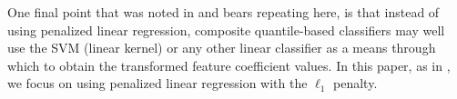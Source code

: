 One final point that was noted in \cite{fan2016} and bears repeating here, is
that instead of using penalized linear regression, composite quantile-based
classifiers may well use the SVM (linear kernel) or any other linear classifier
as a means through which to obtain the transformed feature coefficient values.
In this paper, as in \cite{fan2016}, we focus on using penalized linear
regression with the $\ell_1$ penalty.









